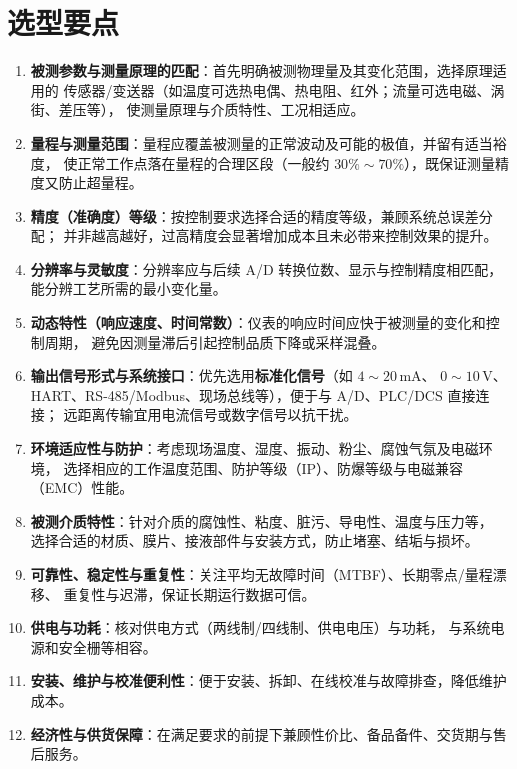 \documentclass[12pt,a4paper]{ctexart}
\begin{document}
\section{选型要点}
\begin{enumerate}
  \item \textbf{被测参数与测量原理的匹配}：首先明确被测物理量及其变化范围，选择原理适用的
        传感器/变送器（如温度可选热电偶、热电阻、红外；流量可选电磁、涡街、差压等），
        使测量原理与介质特性、工况相适应。
  \item \textbf{量程与测量范围}：量程应覆盖被测量的正常波动及可能的极值，并留有适当裕度，
        使正常工作点落在量程的合理区段（一般约 $30\%\sim70\%$），既保证测量精度又防止超量程。
  \item \textbf{精度（准确度）等级}：按控制要求选择合适的精度等级，兼顾系统总误差分配；
        并非越高越好，过高精度会显著增加成本且未必带来控制效果的提升。
  \item \textbf{分辨率与灵敏度}：分辨率应与后续 A/D 转换位数、显示与控制精度相匹配，
        能分辨工艺所需的最小变化量。
  \item \textbf{动态特性（响应速度、时间常数）}：仪表的响应时间应快于被测量的变化和控制周期，
        避免因测量滞后引起控制品质下降或采样混叠。
  \item \textbf{输出信号形式与系统接口}：优先选用\textbf{标准化信号}（如 $4\sim20\,\mathrm{mA}$、
        $0\sim10\,\mathrm{V}$、HART、RS-485/Modbus、现场总线等），便于与 A/D、PLC/DCS 直接连接；
        远距离传输宜用电流信号或数字信号以抗干扰。
  \item \textbf{环境适应性与防护}：考虑现场温度、湿度、振动、粉尘、腐蚀气氛及电磁环境，
        选择相应的工作温度范围、防护等级（IP）、防爆等级与电磁兼容（EMC）性能。
  \item \textbf{被测介质特性}：针对介质的腐蚀性、粘度、脏污、导电性、温度与压力等，
        选择合适的材质、膜片、接液部件与安装方式，防止堵塞、结垢与损坏。
  \item \textbf{可靠性、稳定性与重复性}：关注平均无故障时间（MTBF）、长期零点/量程漂移、
        重复性与迟滞，保证长期运行数据可信。
  \item \textbf{供电与功耗}：核对供电方式（两线制/四线制、供电电压）与功耗，
        与系统电源和安全栅等相容。
  \item \textbf{安装、维护与校准便利性}：便于安装、拆卸、在线校准与故障排查，降低维护成本。
  \item \textbf{经济性与供货保障}：在满足要求的前提下兼顾性价比、备品备件、交货期与售后服务。
\end{enumerate}
 
\end{document}

